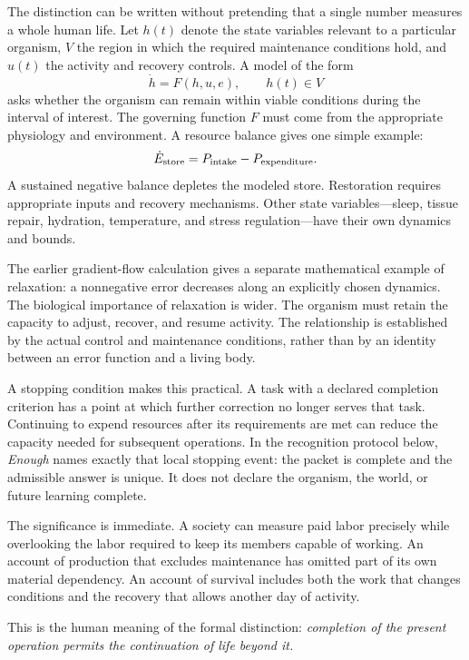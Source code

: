 \documentclass[10pt]{article}
\begin{document}
The distinction can be written without pretending that a single number measures a whole human life. Let $h(t)$ denote the state variables relevant to a particular organism, $V$ the region in which the required maintenance conditions hold, and $u(t)$ the activity and recovery controls. A model of the form
\begin{equation}
\dot h=F(h,u,e),\qquad h(t)\in V
\end{equation}
asks whether the organism can remain within viable conditions during the interval of interest. The governing function $F$ must come from the appropriate physiology and environment. A resource balance gives one simple example:
\begin{equation}
\dot E_{\rm store}=P_{\rm intake}-P_{\rm expenditure}.
\end{equation}
A sustained negative balance depletes the modeled store. Restoration requires appropriate inputs and recovery mechanisms. Other state variables---sleep, tissue repair, hydration, temperature, and stress regulation---have their own dynamics and bounds.

The earlier gradient-flow calculation gives a separate mathematical example of relaxation: a nonnegative error decreases along an explicitly chosen dynamics. The biological importance of relaxation is wider. The organism must retain the capacity to adjust, recover, and resume activity. The relationship is established by the actual control and maintenance conditions, rather than by an identity between an error function and a living body.

A stopping condition makes this practical. A task with a declared completion criterion has a point at which further correction no longer serves that task. Continuing to expend resources after its requirements are met can reduce the capacity needed for subsequent operations. In the recognition protocol below, \emph{Enough} names exactly that local stopping event: the packet is complete and the admissible answer is unique. It does not declare the organism, the world, or future learning complete.

The significance is immediate. A society can measure paid labor precisely while overlooking the labor required to keep its members capable of working. An account of production that excludes maintenance has omitted part of its own material dependency. An account of survival includes both the work that changes conditions and the recovery that allows another day of activity.

This is the human meaning of the formal distinction: \emph{completion of the present operation permits the continuation of life beyond it.}
\end{document}
